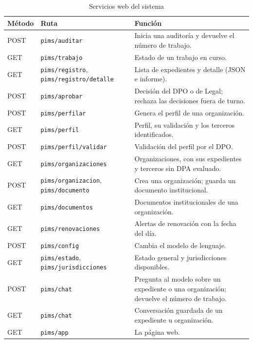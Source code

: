 \documentclass[12pt,letterpaper]{article}
\begin{document}
\begin{table}[H]
\centering
\small
\caption{Servicios web del sistema}
\label{tab:api}
\begin{tabularx}{\linewidth}{@{}L{1.2cm} L{5.0cm} Y@{}}
\toprule
\textbf{Método} & \textbf{Ruta} & \textbf{Función} \\
\midrule
POST & \texttt{pims/auditar} & Inicia una auditoría y devuelve el número de trabajo. \\
GET & \texttt{pims/trabajo} & Estado de un trabajo en curso. \\
GET & \texttt{pims/registro}, \texttt{pims/registro/detalle} & Lista de expedientes y detalle (JSON e informe). \\
POST & \texttt{pims/aprobar} & Decisión del DPO o de Legal; rechaza las decisiones fuera de turno. \\
POST & \texttt{pims/perfilar} & Genera el perfil de una organización. \\
GET & \texttt{pims/perfil} & Perfil, su validación y los terceros identificados. \\
POST & \texttt{pims/perfil/validar} & Validación del perfil por el DPO. \\
GET & \texttt{pims/organizaciones} & Organizaciones, con sus expedientes y terceros sin DPA evaluado. \\
POST & \texttt{pims/organizacion}, \texttt{pims/documento} & Crea una organización; guarda un documento institucional. \\
GET & \texttt{pims/documentos} & Documentos institucionales de una organización. \\
GET & \texttt{pims/renovaciones} & Alertas de renovación con la fecha del día. \\
POST & \texttt{pims/config} & Cambia el modelo de lenguaje. \\
GET & \texttt{pims/estado}, \texttt{pims/jurisdicciones} & Estado general y jurisdicciones disponibles. \\
POST & \texttt{pims/chat} & Pregunta al modelo sobre un expediente o una organización; devuelve el número de trabajo. \\
GET & \texttt{pims/chat} & Conversación guardada de un expediente u organización. \\
GET & \texttt{pims/app} & La página web. \\
\bottomrule
\end{tabularx}
\end{table}
\end{document}
